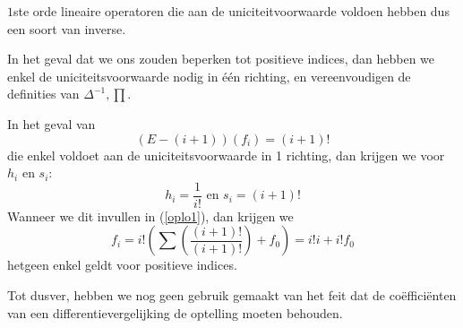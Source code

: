 \documentclass[a4paper,12pt]{article}
\begin{document}
\begin{remark}
    $1$ste orde lineaire operatoren die aan de uniciteitvoorwaarde voldoen hebben dus een soort van inverse.
\end{remark}

\begin{remark}
    In het geval dat we ons zouden beperken tot positieve indices, dan hebben we enkel de uniciteitsvoorwaarde nodig in één richting, en vereenvoudigen de definities van
    $\Delta^{-1}, \prod$.
\end{remark}



\begin{example}
    In het geval van
    $$
        (E -(i+1))(f_i) = (i+1)!
    $$
    die enkel voldoet aan de uniciteitsvoorwaarde in 1 richting, dan krijgen we voor $h_i$ en $s_i$:
    $$
        h_i = \frac{1}{i!} \text{ en } s_i = (i+1)!
    $$
    Wanneer we dit invullen in (\ref{oplo1}), dan krijgen we
    $$
        f_i = i! \left( \sum {\left( \frac{(i+1)!}{(i+1)!} \right)} + f_0 \right) = i! i + i! f_0
    $$
    hetgeen enkel geldt voor positieve indices.
\end{example}


\begin{remark}
    Tot dusver, hebben we nog geen gebruik gemaakt van het feit dat de coëfficiënten van een differentievergelijking
    de optelling moeten behouden.
\end{remark}
\end{document}
